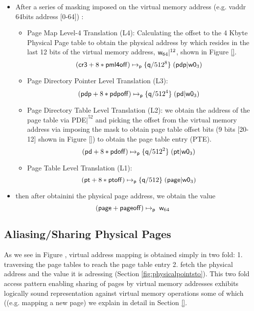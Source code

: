 \begin{itemize}
\item  After a series of masking imposed on the virtual memory address (e.g. \textsf{vaddr} 64bits address [0-64]) :
  \begin{itemize}
  \item Page Map Level-4 Translation (L4): Calculating the offset to the 4 \textsf{Kbyte Physical Page} table to obtain the  physical address by  which resides in the last 12 bits of the virtual memory address, $\mathsf{w}_{64}|^{12}$,  shown in Figure \ref{}.
    \[  (\mathsf{cr3}+8*\mathsf{pml4off})\mapsto_{\mathsf{p}}\{\mathsf{q}/512^{8}\}\;(\mathsf{pdp} | \mathsf{w0}_{3}) \\ \]
  \item Page Directory Pointer Level Translation (L3):
    \[ (\mathsf{pdp}+8*\mathsf{pdpoff})\mapsto_{\mathsf{p}}\{\mathsf{q}/512^{4}\}\;(\mathsf{pd} | \mathsf{w0}_{3}) \\ \]
  \item Page Directory Table Level Translation (L2):  we obtain the address of the page table via \textsf{PDE}$|^{52}$ and picking the offset from the virtual memory address via imposing the mask to obtain page table offset bits (9 bits [20-12] shown in Figure \ref{}) to obtain the page table entry (\textsf{PTE}).
    \[  (\mathsf{pd}+8*\mathsf{pdoff})\mapsto_{\mathsf{p}}\{\mathsf{q}/512^{2}\}\;(\mathsf{pt} | \mathsf{w0}_{3}) \\ \]
  \item Page Table Level Translation (L1):
    \[  (\mathsf{pt}+8*\mathsf{ptoff})\mapsto_{\mathsf{p}}\{\mathsf{q}/512\}\;(\mathsf{page} | \mathsf{w0}_{3}) \\ \]
  \end{itemize}
\item then after obtainini the physical page address, we obtain the value
  \[  (\mathsf{page}+\mathsf{pageoff})\mapsto_{\mathsf{p}}\;\mathsf{w}_{64} \]
\end{itemize}


\subsection{Aliasing/Sharing Physical Pages}
\label{sec:sharingpages}
As we see in Figure , virtual address mapping is obtained simply in two fold: 1. traversing the page tables to reach the page table entry 2. fetch the physical address and the value it is adressing (Section \ref{fig:physicalpointsto}). This two fold access pattern enabling sharing of pages by virtual memory addresses exhibits logically sound representation against virtual memory operations some of which ((e.g. mapping a new page) we explain in detail in Section \ref{}.

